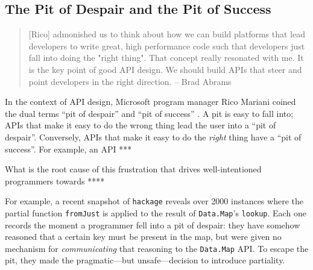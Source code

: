 \documentclass[format=sigplan, review=false, screen=true]{acmart}
\begin{document}
\subsection{The Pit of Despair and the Pit of Success}
\begin{quote}
  [Rico] admonished us to think about how we can build platforms that lead developers to write great, high performance code such that developers just fall into doing the "right thing". That concept really resonated with me. It is the key point of good API design. We should build APIs that steer and point developers in the right direction.
  \hfill -- Brad Abrams
\end{quote}

In the context of API design, Microsoft program manager
Rico Mariani coined the dual terms ``pit of despair'' and
``pit of success'' \cite{pitofsuccess}. A pit is easy to fall into; APIs that
make it easy to do the wrong thing lead the user into a ``pit of despair''.
Conversely, APIs that make it easy to do the \emph{right} thing
have a ``pit of success''. For example, an API ***

What is the root cause of this frustration that drives
well-intentioned programmers towards ****


For example, a recent snapshot of \texttt{hackage}
reveals over 2000 instances where the partial function
\texttt{fromJust} is applied to the
result of \texttt{Data.Map}'s \texttt{lookup}. Each one
records the moment a programmer fell into a pit of despair:
they have somehow reasoned that a certain key must be
present in the map, but were given no mechanism for
\emph{communicating} that reasoning to the
\texttt{Data.Map} API. To escape the pit, they made the
pragmatic---but unsafe---decision to introduce partiality.
\end{document}
